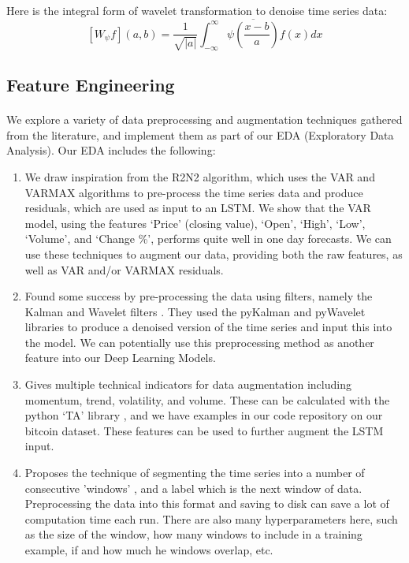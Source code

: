 \documentclass{article}
\begin{document}
\item Here is the integral form of wavelet transformation to denoise time series data:
\[\left[W_\psi f\right](a, b) = \frac{1}{\sqrt{|a|}} \int_{-\infty}^\infty \overline{\psi\left(\frac{x-b}{a}\right)}f(x)dx\]

\subsection{Feature Engineering}

\paragraph{}
We explore a variety of data preprocessing and augmentation techniques gathered from the literature, and implement them as part of our EDA (Exploratory Data Analysis). Our EDA includes the following:

\begin{enumerate}
\item  We draw inspiration from the R2N2 \cite{1_website} algorithm, which uses the VAR and VARMAX algorithms to pre-process the time series data and produce residuals, which are used as input to an LSTM. We show that the VAR model, using the features ‘Price’ (closing value), ‘Open’, ‘High’, ‘Low’, ‘Volume’, and ‘Change \%’, performs quite well in one day forecasts. We can use these techniques to augment our data, providing both the raw features, as well as VAR and/or VARMAX residuals.

\item Found some success by pre-processing the data using filters, namely the Kalman and Wavelet filters \cite{2_website}. They used the pyKalman and pyWavelet libraries to produce a denoised version of the time series and input this into the model. We can potentially use this preprocessing method as another feature into our Deep Learning Models.

\item Gives multiple technical indicators for data augmentation including momentum, trend, volatility, and volume. These can be calculated with the python ‘TA’ library \cite{3_website}, and we have examples in our code repository on our bitcoin dataset. These features can be used to further augment the LSTM input.

\item Proposes the technique of segmenting the time series into a number of consecutive 'windows'  \cite{4_website}, and a label which is the next window of data. Preprocessing the data into this format and saving to disk can save a lot of computation time each run. There are also many hyperparameters here, such as the size of the window, how many windows to include in a training example, if and how much he windows overlap, etc.
\end{enumerate}
\end{document}
